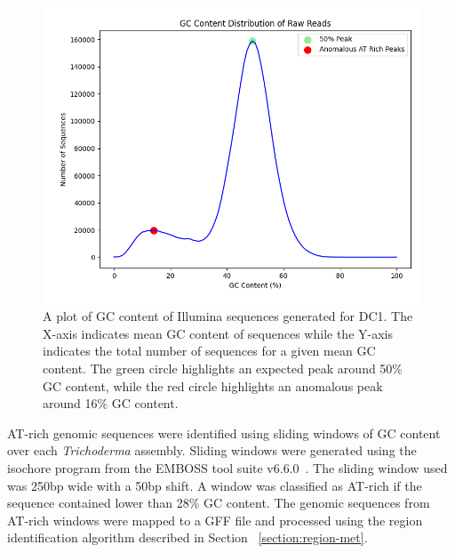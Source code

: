 \begin{figure}
  \centering
  \includegraphics[width=\textwidth]{figures/raw-dc1-gc-plot.png}
  \caption[GC content distribution for DC1]{A plot of GC content of Illumina sequences generated for
    DC1. The X-axis indicates mean GC content of sequences while the
    Y-axis indicates the total number of sequences for a given mean GC
    content. The green circle highlights an expected peak around 50\% GC content, while the red circle highlights an anomalous peak around 16\% GC content.}
  \label{fig:dc1-low-gc}
\end{figure}

AT-rich genomic sequences were identified using sliding windows of GC
content over each \textit{Trichoderma} assembly. Sliding windows were
generated using the isochore program from the EMBOSS tool suite
v6.6.0~\cite{rice2000a}. The sliding window used was 250bp wide with a
50bp shift. A window was classified as AT-rich if the sequence
contained lower than 28\% GC content. The genomic sequences from
AT-rich windows were mapped to a GFF file and processed using the
region identification algorithm described in Section
~\ref{section:region-met}.



